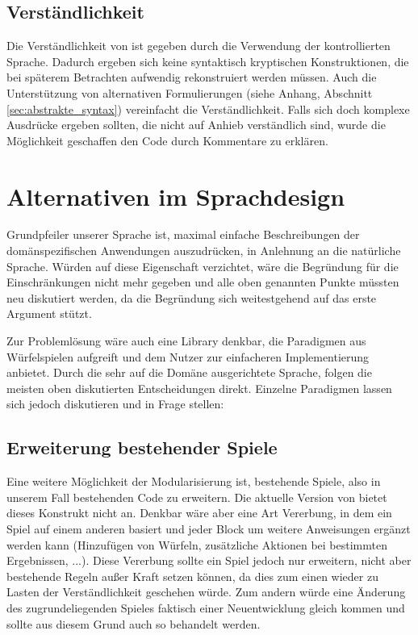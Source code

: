 	\subsection{Verständlichkeit}
	\label{sub:verstandlichkeit}
		Die Verständlichkeit von \dg ist gegeben durch die Verwendung der kontrollierten Sprache. Dadurch ergeben sich keine syntaktisch kryptischen Konstruktionen, die bei späterem Betrachten aufwendig rekonstruiert werden müssen. Auch die Unterstützung von alternativen Formulierungen (siehe Anhang, Abschnitt \ref{sec:abstrakte_syntax}) vereinfacht die Verständlichkeit. Falls sich doch komplexe Ausdrücke ergeben sollten, die nicht auf Anhieb verständlich sind, wurde die Möglichkeit geschaffen den Code durch Kommentare zu erklären.

\section{Alternativen im Sprachdesign}
\label{sec:alternativen_im_sprachdesign} 
	Grundpfeiler unserer Sprache ist, maximal einfache Beschreibungen der domänspezifischen Anwendungen auszudrücken, in Anlehnung an die natürliche Sprache. Würden auf diese Eigenschaft verzichtet, wäre die Begründung für die Einschränkungen nicht mehr gegeben und alle oben genannten Punkte müssten neu diskutiert werden, da die Begründung sich weitestgehend auf das erste Argument stützt. 

	Zur Problemlösung wäre auch eine Library denkbar, die Paradigmen aus Würfelspielen aufgreift und dem Nutzer zur einfacheren Implementierung anbietet. Durch die sehr auf die Domäne ausgerichtete Sprache, folgen die meisten oben diskutierten Entscheidungen direkt. Einzelne Paradigmen lassen sich jedoch diskutieren und in Frage stellen:

	\subsection{Erweiterung bestehender Spiele}
	\label{sub:erweiterung_bestehender_spiele}
		Eine weitere Möglichkeit der Modularisierung ist, bestehende Spiele, also in unserem Fall bestehenden Code zu erweitern. Die aktuelle Version von \dg bietet dieses Konstrukt nicht an. Denkbar wäre aber eine Art Vererbung, in dem ein Spiel auf einem anderen basiert und jeder Block um weitere Anweisungen ergänzt werden kann (Hinzufügen von Würfeln, zusätzliche Aktionen bei bestimmten Ergebnissen, ...). Diese Vererbung sollte ein Spiel jedoch nur erweitern, nicht aber bestehende Regeln außer Kraft setzen können, da dies zum einen wieder zu Lasten der Verständlichkeit geschehen würde. Zum andern würde eine Änderung des zugrundeliegenden Spieles faktisch einer Neuentwicklung gleich kommen und sollte aus diesem Grund auch so behandelt werden.

